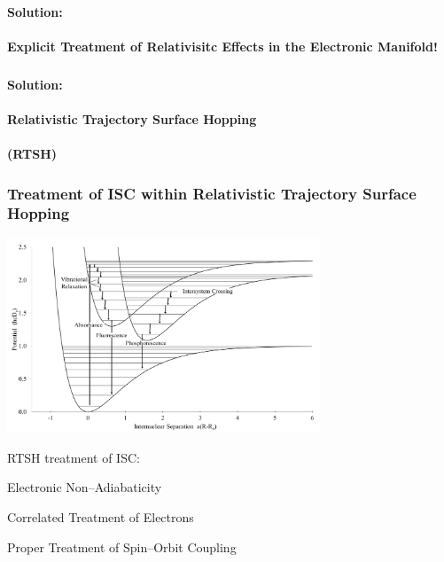 \documentclass[usepdftitle=false,10pt]{beamer}
\newcommand{\cmark}{\color{green} \ding{51}}%
\newcommand{\done}{\rlap{$\square$}{\raisebox{2pt}{\large\hspace{1pt}\cmark}}%
\hspace{-2.5pt}}
\begin{document}
\begin{frame}
  \frametitle{}
  \begin{center}
  {\LARGE \bf Solution: \\~\\ Explicit Treatment of Relativisitc Effects in the Electronic Manifold!}
  \end{center}
\end{frame}

\begin{frame}
  \frametitle{}
  \begin{center}
  {\LARGE \bf Solution: \\~\\ Relativistic Trajectory Surface Hopping \\~\\(RTSH)}
  \end{center}
\end{frame}

\begin{frame}
  \frametitle{Treatment of ISC within Relativistic Trajectory Surface Hopping}
  \begin{center}
  \includegraphics[width=0.7\textwidth]{ISC} 
  \end{center}
  \vspace{-0.5cm}
  RTSH treatment of ISC: 
  \begin{mylist}
    \item[\done] Electronic Non--Adiabaticity
    \item[\done] Correlated Treatment of Electrons
    \item[\done] Proper Treatment of Spin--Orbit Coupling
  \end{mylist}
\end{frame}
\end{document}
